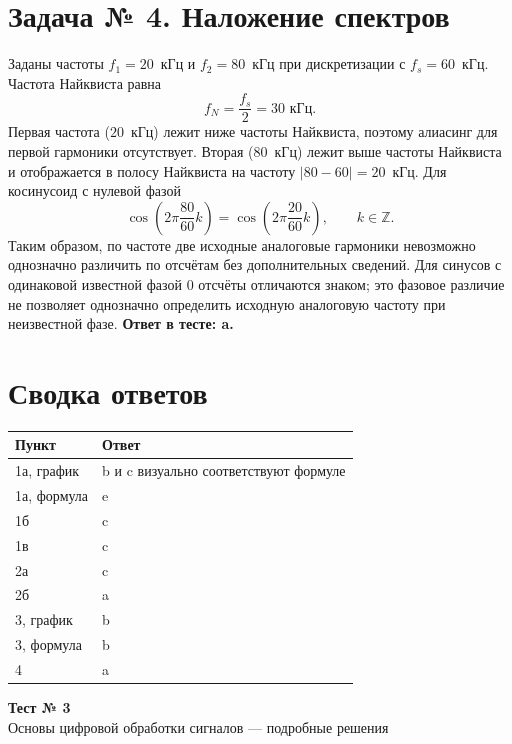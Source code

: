 \documentclass[12pt,a4paper]{article}
\begin{document}
\section*{Задача № 4. Наложение спектров}
Заданы частоты $f_1=20$~кГц и $f_2=80$~кГц при дискретизации
с $f_s=60$~кГц. Частота Найквиста равна
\[
 f_N=\frac{f_s}{2}=30\text{ кГц}.
\]
Первая частота ($20$~кГц) лежит ниже частоты Найквиста,
поэтому алиасинг для первой гармоники отсутствует. Вторая ($80$~кГц)
лежит выше частоты Найквиста и отображается в полосу Найквиста
на частоту $|80-60|=20$~кГц.
Для косинусоид с нулевой фазой
\[
 \cos\left(2\pi\frac{80}{60}k\right)
 =\cos\left(2\pi\frac{20}{60}k\right),\qquad k\in\mathbb Z.
\]
Таким образом, по частоте две исходные аналоговые гармоники
невозможно однозначно различить по отсчётам без дополнительных
сведений. Для синусов с одинаковой известной фазой $0$ отсчёты
отличаются знаком; это фазовое различие не позволяет однозначно
определить исходную аналоговую частоту при неизвестной фазе.
\textbf{Ответ в тесте: a.}

\section*{Сводка ответов}
\begin{center}
\begin{tabular}{ll}
\toprule
Пункт & Ответ\\
\midrule
1а, график & b и c визуально соответствуют формуле\\
1а, формула & e\\
1б & c\\
1в & c\\
2а & c\\
2б & a\\
3, график & b\\
3, формула & b\\
4 & a\\
\bottomrule
\end{tabular}
\end{center}

\clearpage
\begin{center}
{\Huge\bfseries Тест № 3}\\[8pt]
{\large Основы цифровой обработки сигналов — подробные решения}
\end{center}
\vspace{8mm}
\end{document}
